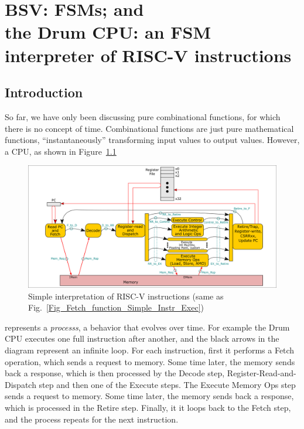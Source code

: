 

\chapter{BSV: FSMs; and \\
the Drum CPU: an FSM interpreter of RISC-V instructions}


\setcounter{page}{1}
\renewcommand{\thepage}{\arabic{chapter}-\arabic{page}}

\label{ch_Drum_FSMs}


\section{Introduction}

So far, we have only been discussing pure combinational functions, for
which there is no concept of time.  Combinational functions are just
pure mathematical functions, ``instantaneously'' transforming input
values to output values.  However, a CPU, as shown in
Figure~\ref{Fig_Drum_Instr_Exec}
\begin{figure}[htbp]
  \centerline{\includegraphics[width=6in,angle=0]{ch030_RISCV_Design_Space/Figures/Fig_Instr_Exec_w_structs}}
  \caption{\label{Fig_Drum_Instr_Exec}
           Simple interpretation of RISC-V instructions
	   (same as Fig.~\ref{Fig_Fetch_function_Simple_Instr_Exec})}
\end{figure}
represents a \emph{processs}, a behavior that evolves over time.  For
example the Drum CPU executes one full instruction after another, and
the black arrows in the diagram represent an infinite loop. For each
instruction, first it performs a Fetch operation, which sends a
request to memory. Some time later, the memory sends back a response,
which is then processed by the Decode step, Register-Read-and-Dispatch
step and then one of the Execute steps.  The Execute Memory Ops step
sends a request to memory. Some time later, the memory sends back a
response, which is processed in the Retire step.  Finally, it it loops
back to the Fetch step, and the process repeats for the next
instruction.

